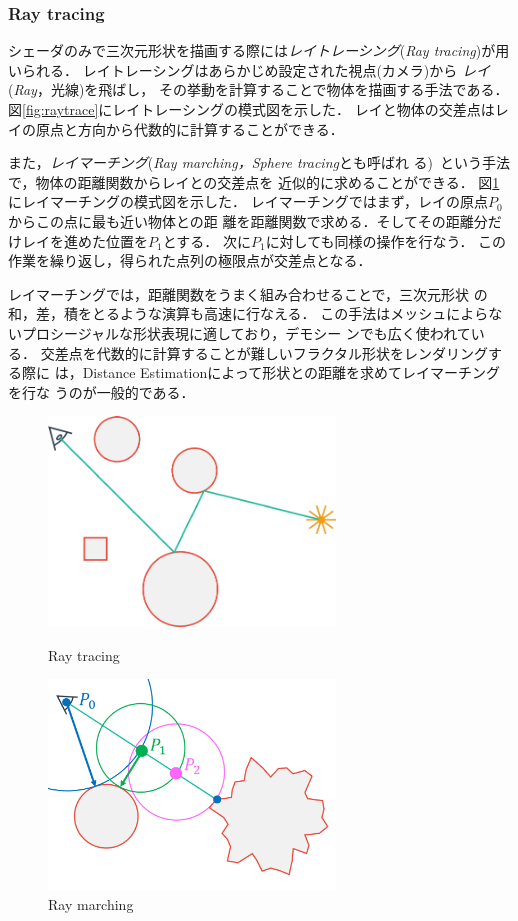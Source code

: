 \subsubsection{Ray tracing}

シェーダのみで三次元形状を描画する際には\emph{レイトレーシング}({\it Ray
tracing})が用いられる．
レイトレーシングはあらかじめ設定された視点(カメラ)から
\emph{レイ}({\it Ray}，光線)を飛ばし，
その挙動を計算することで物体を描画する手法である．
図\ref{fig:raytrace}にレイトレーシングの模式図を示した．
レイと物体の交差点はレイの原点と方向から代数的に計算することができる．

また，\emph{レイマーチング}({\it Ray marching，Sphere tracing}とも呼ばれ
る)~\cite{hart1996sphere}という手法で，物体の距離関数からレイとの交差点を
近似的に求めることができる．
図\ref{fig:raymarch}にレイマーチングの模式図を示した．
レイマーチングではまず，レイの原点$P_0$からこの点に最も近い物体との距
離を距離関数で求める．そしてその距離分だけレイを進めた位置を$P_1$とする．
次に$P_1$に対しても同様の操作を行なう．
この作業を繰り返し，得られた点列の極限点が交差点となる．

レイマーチングでは，距離関数をうまく組み合わせることで，三次元形状
の和，差，積をとるような演算も高速に行なえる．
この手法はメッシュによらないプロシージャルな形状表現に適しており，デモシー
ンでも広く使われている．
交差点を代数的に計算することが難しいフラクタル形状をレンダリングする際に
は，Distance Estimationによって形状との距離を求めてレイマーチングを行な
うのが一般的である．

 \begin{figure}[htbp]
  \begin{minipage}{0.5\hsize}
   \center
   \includegraphics[width=3in, keepaspectratio]{../img/fractal/raytrace.pdf}
   \caption{Ray tracing}
   \label{fig:raytrace}
  \end{minipage}
  \begin{minipage}{0.5\hsize}
   \center
   \includegraphics[width=3in, keepaspectratio]{../img/fractal/raymarching.pdf}
   \caption{Ray marching}
   \label{fig:raymarch}
  \end{minipage}
 \end{figure}

